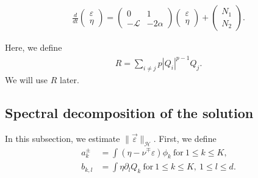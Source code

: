 \documentclass[reqno]{amsart}
\theoremstyle{plain}
\theoremstyle{definition}
\numberwithin{equation}{section}
\newcommand{\1}{\mathbbm{1}}
\begin{document}
\begin{align}\label{epsilonsystem}
\frac{d}{dt}
\begin{pmatrix}
\varepsilon
\\
\eta
\end{pmatrix}
=
\begin{pmatrix}
0 & 1
\\
-\mathcal{L} & -2\alpha
\end{pmatrix}
\begin{pmatrix}
\varepsilon
\\
\eta
\end{pmatrix}
+
\begin{pmatrix}
N_1
\\
N_2
\end{pmatrix}
.
\end{align}

Here, we define 
\begin{align*}
R=\sum_{i\neq j}p|Q_i|^{p-1}Q_j.
\end{align*}
We will use $R$ later.




\subsection{Spectral decomposition of the solution}
In this subsection, we estimate $\|\vec{\varepsilon}\|_{\mathcal{H}}$. First, we define 
\begin{align*}
a_k^{\pm}&=\int ( \eta-\nu^{\mp}\varepsilon)\phi_k\ \mbox{for}\ 1\leq k\leq K,
\\
b_{k,l}&=\int \eta{\partial}_lQ_k\ \mbox{for}\ 1\leq k\leq K,\ 1\leq l\leq d.
\end{align*}
\end{document}

